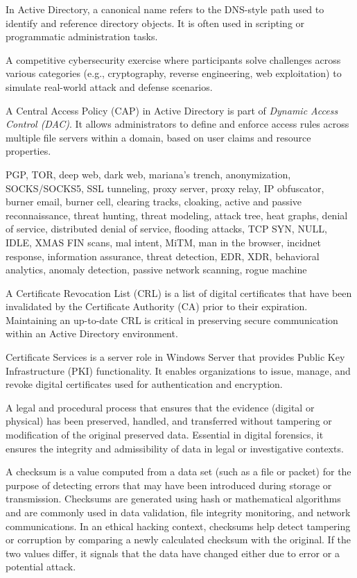  In Active Directory, a canonical name refers to the DNS-style path used to identify and reference directory objects. It is often used in scripting or programmatic administration tasks.

 A competitive cybersecurity exercise where participants solve challenges across various categories (e.g., cryptography, reverse engineering, web exploitation) to simulate real-world attack and defense scenarios.

 A Central Access Policy (CAP) in Active Directory is part of\textit{ Dynamic Access Control (DAC)}. It allows administrators to define and enforce access rules across multiple file servers within a domain, based on user claims and resource properties.

PGP, TOR, deep web, dark web, mariana's trench, anonymization, SOCKS/SOCKS5, SSL tunneling, proxy server, proxy relay, IP obfuscator, burner email, burner cell, clearing tracks, cloaking, active and passive reconnaissance, threat hunting, threat modeling, attack tree, heat graphs, denial of service, distributed denial of service, flooding attacks, TCP SYN, NULL, IDLE, XMAS FIN scans, mal intent, MiTM, man in the browser, incidnet response, information assurance, threat detection, EDR, XDR, behavioral analytics, anomaly detection, passive network scanning, rogue machine

 

 A Certificate Revocation List (CRL) is a list of digital certificates that have been invalidated by the Certificate Authority (CA) prior to their expiration. Maintaining an up-to-date CRL is critical in preserving secure communication within an Active Directory environment.

 Certificate Services is a server role in Windows Server that provides Public Key Infrastructure (PKI) functionality. It enables organizations to issue, manage, and revoke digital certificates used for authentication and encryption.

 A legal and procedural process that ensures that the evidence (digital or physical) has been preserved, handled, and transferred without tampering or modification of the original preserved data. Essential in digital forensics, it ensures the integrity and admissibility of data in legal or investigative contexts.

 A checksum is a value computed from a data set (such as a file or packet) for the purpose of detecting errors that may have been introduced during storage or transmission. Checksums are generated using hash or mathematical algorithms and are commonly used in data validation, file integrity monitoring, and network communications. In an ethical hacking context, checksums help detect tampering or corruption by comparing a newly calculated checksum with the original. If the two values differ, it signals that the data have changed either due to error or a potential attack.

